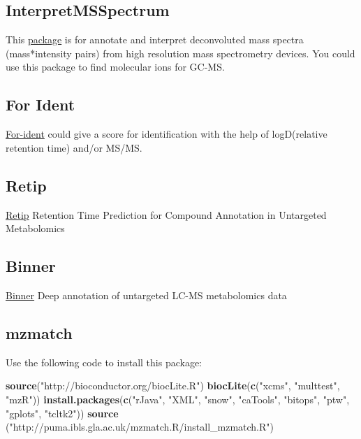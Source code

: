 \documentclass[
]{book}
\newenvironment{Shaded}{\begin{snugshade}}{\end{snugshade}}
\newcommand{\KeywordTok}[1]{\textcolor[rgb]{0.13,0.29,0.53}{\textbf{#1}}}
\newcommand{\NormalTok}[1]{#1}
\newcommand{\StringTok}[1]{\textcolor[rgb]{0.31,0.60,0.02}{#1}}
\begin{document}
\hypertarget{interpretmsspectrum}{%
\subsection{InterpretMSSpectrum}\label{interpretmsspectrum}}

This \href{https://github.com/cran/InterpretMSSpectrum}{package} is for annotate and interpret deconvoluted mass spectra (mass*intensity pairs) from high resolution mass spectrometry devices. You could use this package to find molecular ions for GC-MS.

\hypertarget{for-ident}{%
\subsection{For Ident}\label{for-ident}}

\href{https://water.for-ident.org/\#!search}{For-ident} could give a score for identification with the help of logD(relative retention time) and/or MS/MS.

\hypertarget{retip}{%
\subsection{Retip}\label{retip}}

\href{https://www.retip.app/}{Retip} Retention Time Prediction for Compound Annotation in Untargeted Metabolomics \citep{bonini2020}

\hypertarget{binner}{%
\subsection{Binner}\label{binner}}

\href{https://binner.med.umich.edu/}{Binner} Deep annotation of untargeted LC-MS metabolomics data \citep{kachman2020}

\hypertarget{mzmatch}{%
\subsection{mzmatch}\label{mzmatch}}

Use the following code to install this package:

\begin{Shaded}
\begin{Highlighting}[]
\KeywordTok{source}\NormalTok{(}\StringTok{"http://bioconductor.org/biocLite.R"}\NormalTok{)}
\KeywordTok{biocLite}\NormalTok{(}\KeywordTok{c}\NormalTok{(}\StringTok{"xcms"}\NormalTok{, }\StringTok{"multtest"}\NormalTok{, }\StringTok{"mzR"}\NormalTok{))}
\KeywordTok{install.packages}\NormalTok{(}\KeywordTok{c}\NormalTok{(}\StringTok{"rJava"}\NormalTok{, }\StringTok{"XML"}\NormalTok{, }\StringTok{"snow"}\NormalTok{, }\StringTok{"caTools"}\NormalTok{,}
   \StringTok{"bitops"}\NormalTok{, }\StringTok{"ptw"}\NormalTok{, }\StringTok{"gplots"}\NormalTok{, }\StringTok{"tcltk2"}\NormalTok{))}
\KeywordTok{source}\NormalTok{ (}\StringTok{"http://puma.ibls.gla.ac.uk/mzmatch.R/install_mzmatch.R"}\NormalTok{)}
\end{Highlighting}
\end{Shaded}
\end{document}
